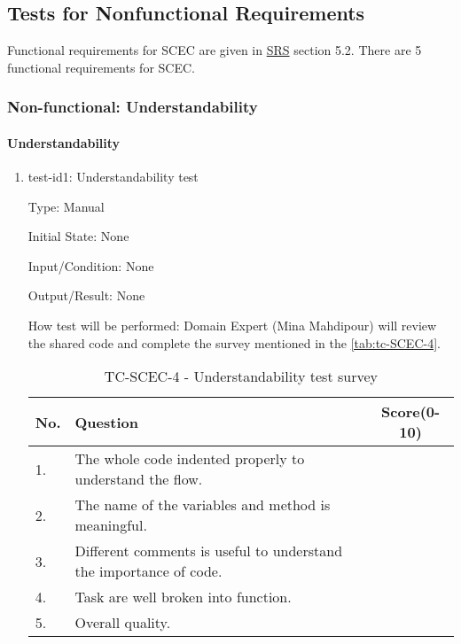 \documentclass[12pt, titlepage]{article}
\begin{document}
\subsection{Tests for Nonfunctional Requirements}

Functional requirements for SCEC are given in \href{https://github.com/DeeshaPatel/CAS-741-Solar-Cooker/blob/7c53c8d9a19ca2f94dfba6ba9208eae0bf03b8cc/docs/SRS/SRS.pdf}{SRS} section 5.2. There are 5 functional requirements for SCEC. 




\subsubsection{Non-functional: Understandability}
\label{non_functional_understandability}		
\paragraph{Understandability}

\begin{enumerate}

\item{test-id1: Understandability test\\}

Type: Manual
					
Initial State: None
					
Input/Condition: None
					
Output/Result: None 
					
How test will be performed: Domain Expert (Mina Mahdipour) will review the shared code and complete the survey mentioned in the \autoref{tab:tc-SCEC-4}.   

\begin{table}[h!]
\begin{center}
\begin{tabular}{ p{0.5cm}|p{10cm}|c }
\hline
No. &  Question   & Score(0-10) \\
\hline
1. & The whole code indented properly to understand the flow. & \\
2. & The name of the variables and method is meaningful. & \\
3. & Different comments is useful to understand the importance of code. &  \\
4. & Task are well broken into function. & \\
5. & Overall quality. & \\

\hline

\end{tabular}
\caption{TC-SCEC-4 - Understandability test survey}
\label{tab:tc-SCEC-4}
\end{center}
\end{table}

\end{enumerate}
\end{document}
